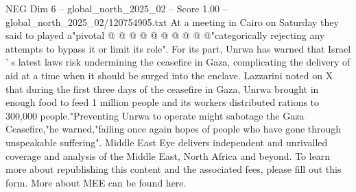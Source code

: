 \begin{textsample}{NEG Dim 6 – global\_north\_2025\_02 – Score 1.00 – global\_north\_2025\_02/120754905.txt}
At a meeting in Cairo on Saturday they said to played a"pivotal @ @ @ @ @ @ @ @ @ @"categorically rejecting any attempts to bypass it or limit its role".
For its part, Unrwa has warned that Israel ' s latest laws risk undermining the ceasefire in Gaza, complicating the delivery of aid at a time when it should be surged into the enclave.
Lazzarini noted on X that during the first three days of the ceasefire in Gaza, Unrwa brought in enough food to feed 1 million people and its workers distributed rations to 300,000 people."Preventing Unrwa to operate might sabotage the Gaza Ceasefire,"he warned,"failing once again hopes of people who have gone through unspeakable suffering".
Middle East Eye delivers independent and unrivalled coverage and analysis of the Middle East, North Africa and beyond.
To learn more about republishing this content and the associated fees, please fill out this form.
More about MEE can be found here.

\end{textsample}
